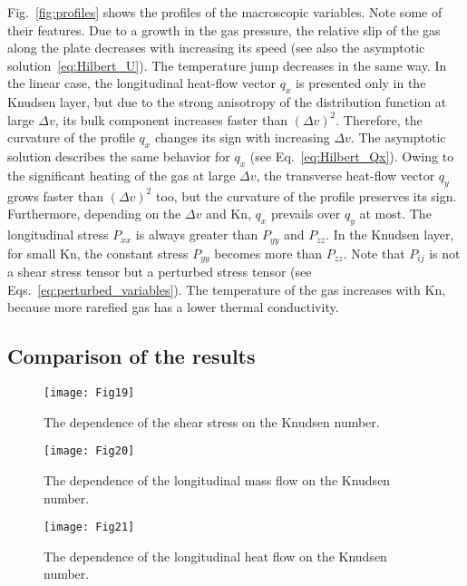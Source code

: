\documentclass[review]{elsarticle}
\newcommand{\Kn}{\mathrm{Kn}}
\begin{document}
Fig.~\ref{fig:profiles} shows the profiles of the macroscopic variables.
Note some of their features.
Due to a growth in the gas pressure, the relative slip of the gas along the plate decreases
with increasing its speed (see also the asymptotic solution~\eqref{eq:Hilbert_U}).
The temperature jump decreases in the same way.
In the linear case, the longitudinal heat-flow vector \(q_x\) is presented only in the Knudsen layer,
but due to the strong anisotropy of the distribution function at large \(\Delta{v}\),
its bulk component increases faster than \((\Delta{v})^2\).
Therefore, the curvature of the profile \(q_x\) changes its sign with increasing \(\Delta{v}\).
The asymptotic solution describes the same behavior for \(q_x\) (see Eq.~\eqref{eq:Hilbert_Qx}).
Owing to the significant heating of the gas at large \(\Delta{v}\),
the transverse heat-flow vector \(q_y\) grows faster than \((\Delta{v})^2\) too,
but the curvature of the profile preserves its sign.
Furthermore, depending on the \(\Delta{v}\) and \(\Kn\), \(q_x\) prevails over \(q_y\) at most.
The longitudinal stress \(P_{xx}\) is always greater than \(P_{yy}\) and \(P_{zz}\).
In the Knudsen layer, for small \(\Kn\), the constant stress \(P_{yy}\) becomes more than \(P_{zz}\).
Note that \(P_{ij}\) is not a shear stress tensor but a perturbed stress tensor
(see Eqs.~\eqref{eq:perturbed_variables}).
The temperature of the gas increases with \(\Kn\), because more rarefied gas
has a lower thermal conductivity.


\subsection{Comparison of the results}

\begin{figure}
    \centering
    \texttt{[image: Fig19]}
    \caption{The dependence of the shear stress on the Knudsen number.}
    \label{fig:shear}
\end{figure}

\begin{figure}
    \centering
    \texttt{[image: Fig20]}
    \caption{The dependence of the longitudinal mass flow on the Knudsen number.}
    \label{fig:flow}
\end{figure}

\begin{figure}
    \centering
    \texttt{[image: Fig21]}
    \caption{The dependence of the longitudinal heat flow on the Knudsen number.}
    \label{fig:qflow}
\end{figure}
\end{document}
